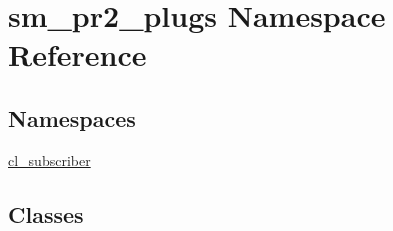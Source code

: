 \hypertarget{namespacesm__pr2__plugs}{}\section{sm\+\_\+pr2\+\_\+plugs Namespace Reference}
\label{namespacesm__pr2__plugs}
\subsection*{Namespaces}
\begin{DoxyCompactItemize}
\item 
 \hyperlink{namespacesm__pr2__plugs_1_1cl__subscriber}{cl\+\_\+subscriber}
\end{DoxyCompactItemize}
\subsection*{Classes}
